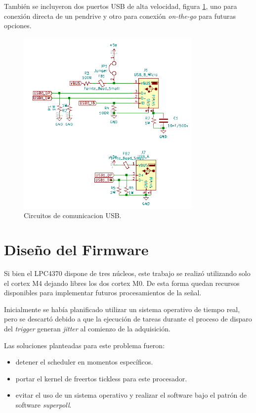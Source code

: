 También se incluyeron dos puertos USB de alta velocidad, figura \ref{fig:schUSB}, uno para conexión directa de un pendrive y otro para conexión \textit{on-the-go} para futuras opciones.

\begin{figure}[ht]
	\centering
	\includegraphics[width=90mm]{./Figures/schUSB.png}
	\caption{Circuitos de comunicacion USB.}
	\label{fig:schUSB}
\end{figure}

\newpage

\section{Diseño del Firmware}

Si bien el LPC4370 dispone de tres núcleos, este trabajo se realizó utilizando solo el cortex M4 dejando libres los dos cortex M0. De esta forma quedan recursos disponibles para implementar futuros procesamientos de la señal. 

Inicialmente se había planificado utilizar un sistema operativo de tiempo real, pero se descartó debido a que la ejecución de tareas durante el proceso de disparo del \textit{trigger} generan \textit{jitter} al comienzo de la adquisición. 

Las soluciones planteadas para este problema fueron:
\vspace{5mm}

\begin{itemize}
\item detener el scheduler en momentos específicos.
\item portar el kernel de freertos tickless para este procesador.
\item evitar el uso de un sistema operativo y realizar el software bajo el patrón de software \textit{superpoll}.
\end{itemize}   


